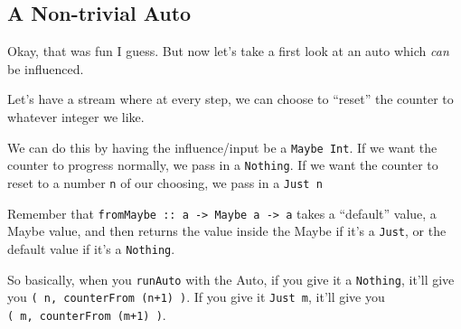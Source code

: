 \documentclass[]{article}
\newenvironment{Shaded}{}{}
\newcommand{\CommentTok}[1]{\textcolor[rgb]{0.38,0.63,0.69}{\textit{#1}}}
\newcommand{\DataTypeTok}[1]{\textcolor[rgb]{0.56,0.13,0.00}{#1}}
\newcommand{\DecValTok}[1]{\textcolor[rgb]{0.25,0.63,0.44}{#1}}
\newcommand{\FunctionTok}[1]{\textcolor[rgb]{0.02,0.16,0.49}{#1}}
\newcommand{\KeywordTok}[1]{\textcolor[rgb]{0.00,0.44,0.13}{\textbf{#1}}}
\newcommand{\NormalTok}[1]{#1}
\newcommand{\OtherTok}[1]{\textcolor[rgb]{0.00,0.44,0.13}{#1}}
\begin{document}
\hypertarget{a-non-trivial-auto}{%
\subsection{A Non-trivial Auto}\label{a-non-trivial-auto}}

Okay, that was fun I guess. But now let's take a first look at an auto which
\emph{can} be influenced.

Let's have a stream where at every step, we can choose to ``reset'' the counter
to whatever integer we like.

We can do this by having the influence/input be a \texttt{Maybe\ Int}. If we
want the counter to progress normally, we pass in a \texttt{Nothing}. If we want
the counter to reset to a number \texttt{n} of our choosing, we pass in a
\texttt{Just\ n}

\begin{Shaded}
\end{Shaded}

Remember that
\texttt{fromMaybe\ ::\ a\ -\textgreater{}\ Maybe\ a\ -\textgreater{}\ a} takes a
``default'' value, a Maybe value, and then returns the value inside the Maybe if
it's a \texttt{Just}, or the default value if it's a \texttt{Nothing}.

So basically, when you \texttt{runAuto} with the Auto, if you give it a
\texttt{Nothing}, it'll give you \texttt{(\ n,\ counterFrom\ (n+1)\ )}. If you
give it \texttt{Just\ m}, it'll give you \texttt{(\ m,\ counterFrom\ (m+1)\ )}.
\end{document}
